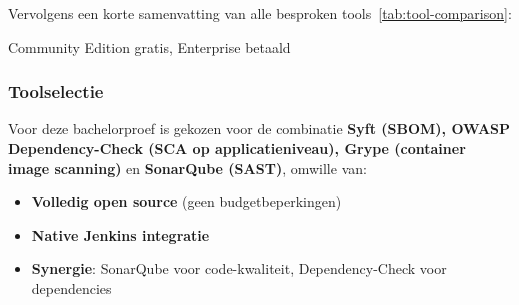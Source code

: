Vervolgens een korte samenvatting van alle besproken tools~\ref{tab:tool-comparison}:
\begin{table}[h]
  \centering
  \caption{Vergelijking security tools voor Jenkins DevSecOps pipeline}
  \label{tab:tool-comparison}

  \vspace{2mm}
  
  \small *Community Edition gratis, Enterprise betaald
\end{table}

\subsubsection{Toolselectie}
Voor deze bachelorproef is gekozen voor de combinatie \textbf{Syft (SBOM), OWASP\\Dependency-Check (SCA op applicatieniveau), Grype (container image scanning)} en \textbf{SonarQube (SAST)}, omwille van:
\begin{itemize}
    \item \textbf{Volledig open source} (geen budgetbeperkingen)
    \item \textbf{Native Jenkins integratie}
    \item \textbf{Synergie}: SonarQube voor code-kwaliteit, Dependency-Check voor dependencies
\end{itemize}

